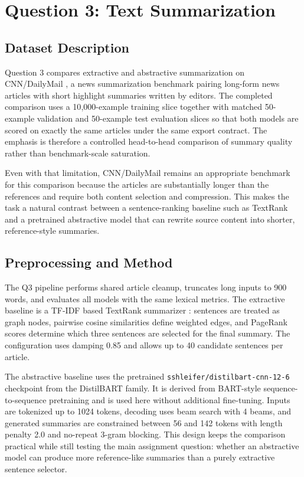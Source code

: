 \section{Question 3: Text Summarization}

\subsection{Dataset Description}

Question 3 compares extractive and abstractive summarization on CNN/DailyMail \cite{see2017get}, a news summarization benchmark pairing long-form news articles with short highlight summaries written by editors. The completed comparison uses a 10{,}000-example training slice together with matched 50-example validation and 50-example test evaluation slices so that both models are scored on exactly the same articles under the same export contract. The emphasis is therefore a controlled head-to-head comparison of summary quality rather than benchmark-scale saturation.

Even with that limitation, CNN/DailyMail remains an appropriate benchmark for this comparison because the articles are substantially longer than the references and require both content selection and compression. This makes the task a natural contrast between a sentence-ranking baseline such as TextRank and a pretrained abstractive model that can rewrite source content into shorter, reference-style summaries.

\subsection{Preprocessing and Method}

The Q3 pipeline performs shared article cleanup, truncates long inputs to 900 words, and evaluates all models with the same lexical metrics. The extractive baseline is a TF-IDF based TextRank summarizer \cite{mihalcea2004textrank}: sentences are treated as graph nodes, pairwise cosine similarities define weighted edges, and PageRank scores determine which three sentences are selected for the final summary. The configuration uses damping 0.85 and allows up to 40 candidate sentences per article.

The abstractive baseline uses the pretrained \nolinkurl{sshleifer/distilbart-cnn-12-6} checkpoint from the DistilBART family. It is derived from BART-style sequence-to-sequence pretraining \cite{lewis2020bart} and is used here without additional fine-tuning. Inputs are tokenized up to 1024 tokens, decoding uses beam search with 4 beams, and generated summaries are constrained between 56 and 142 tokens with length penalty 2.0 and no-repeat 3-gram blocking. This design keeps the comparison practical while still testing the main assignment question: whether an abstractive model can produce more reference-like summaries than a purely extractive sentence selector.

